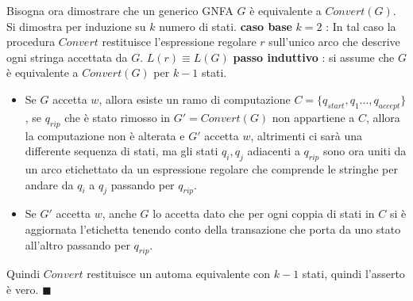 \documentclass[10pt, letterpaper]{report}
\begin{document}
Bisogna ora dimostrare che un generico GNFA $G$ è equivalente a $Convert(G)$. Si dimostra per induzione su 
$k$ numero di stati.\acc 
  \textbf{caso base} $k=2$ : In tal caso la procedura $Convert$ restituisce l'espressione regolare 
    $r$ sull'unico arco che descrive ogni stringa accettata da $G$. $L(r)\equiv L(G)$ \acc 
    \textbf{passo induttivo} : si assume che $G$ è equivalente a $Convert(G)$ per $k-1$ stati.\begin{itemize}
        \item Se $G$ accetta $w$, allora esiste un ramo di computazione $C=\{q_{start},q_1\dots, q_{accept}\}$, se 
        $q_{rip}$ che è stato rimosso in $G'=Convert(G)$ non appartiene a $C$, allora la computazione non è 
        alterata e $G'$ accetta $w$, altrimenti ci sarà una differente sequenza di stati, ma gli stati $q_i,q_j$ adiacenti 
        a $q_{rip}$ sono ora uniti da un arco etichettato da un espressione regolare che comprende le stringhe per 
        andare da $q_i$ a $q_j$ passando per $q_{rip}$.
        \item Se $G'$ accetta $w$, anche $G$ lo accetta dato che per ogni coppia di stati in $C$ si è aggiornata 
        l'etichetta tenendo conto della transazione che porta da uno stato all'altro passando per $q_{rip}$.
    \end{itemize}
Quindi $Convert$ restituisce un automa equivalente con $k-1$ stati, quindi l'asserto è vero. $\blacksquare$\newpage
\end{document}
